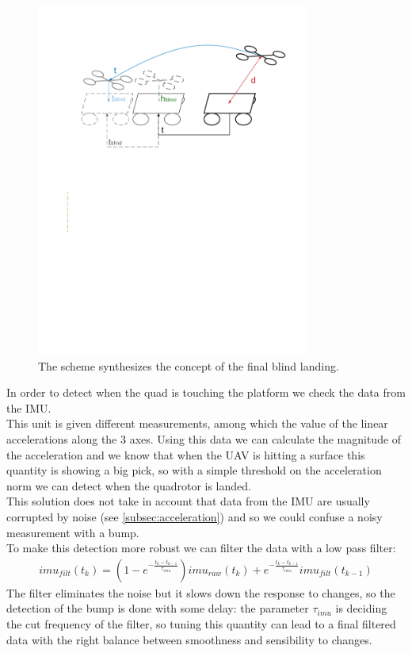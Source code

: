 \begin{figure}[!htbp]
    \centering
    \includegraphics[width=0.8\textwidth]{img/blind_landing.pdf}
    \caption{The scheme synthesizes the concept of the final blind landing. }
    \label{fig:align_platform}
\end{figure}

In order to detect when the quad is touching the platform we check the data from the IMU. \\
This unit is given different measurements, among which the value of the linear accelerations along the 3 axes. Using this data we can calculate the magnitude of the acceleration and we know that when the UAV is hitting a surface this quantity is showing a big pick, so with a simple threshold on the acceleration norm we can detect when the quadrotor is landed.\\
This solution does not take in account that data from the IMU are usually corrupted by noise (see \ref{subsec:acceleration}) and so we could confuse a noisy measurement with a bump. \\
To make this detection more robust we can filter the data with a low pass filter:
\begin{align}
imu_{filt}(t_k) =  (1-e^{-\frac{t_k-t_{k-1}}{\tau_{imu}}})imu_{raw}(t_k) + e^{-\frac{t_k-t_{k-1}}{\tau_{imu}}} imu_{filt}(t_{k-1})
\label{eq:imu_filtered}
\end{align} 
The filter eliminates the noise but it slows down the response to changes, so the detection of the bump is done with some delay: the parameter $\tau_{imu}$ is deciding the cut frequency of the filter, so tuning this quantity can lead to a final filtered data with the right balance between smoothness and sensibility to changes.\\  

